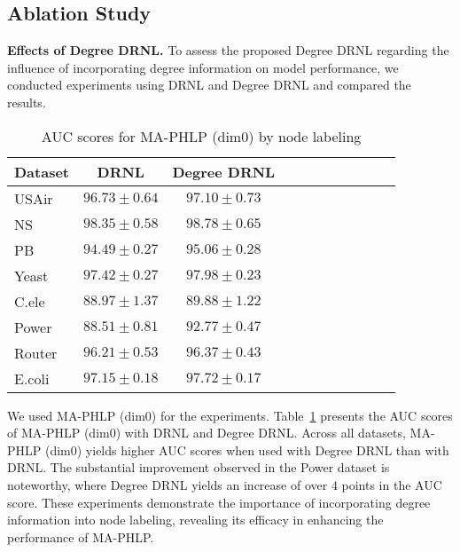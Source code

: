 \subsection{Ablation Study}
\noindent\textbf{Effects of Degree DRNL.} To assess the proposed Degree DRNL regarding the influence of incorporating degree information on model performance, we conducted experiments using DRNL and Degree DRNL and compared the results. 
\begin{table}[ht!]
\centering
\caption{AUC scores for MA-PHLP (dim$0$) by node labeling}
\begin{tabular}{l|cccccccccc}
\toprule
Dataset & DRNL & Degree DRNL \\
\midrule
USAir & $96.73\pm0.64$ & $\mathbf{97.10} \pm \mathbf{0.73}$ \\
NS & ${98.35} \pm {0.58}$ & $\mathbf{98.78}\pm\mathbf{0.65}$ \\ 
PB & $94.49\pm0.27$ & $\mathbf{95.06} \pm \mathbf{0.28}$ \\ 
Yeast & $97.42\pm0.27$ & $\mathbf{97.98} \pm \mathbf{0.23}$ \\
C.ele& $88.97\pm1.37$ & $\mathbf{89.88} \pm \mathbf{1.22}$ \\
Power & $88.51\pm0.81$ & $\mathbf{92.77} \pm \mathbf{0.47}$ \\
Router & $96.21\pm0.53$ & $\mathbf{96.37} \pm \mathbf{0.43}$ \\ 
E.coli & $97.15\pm0.18$ & $\mathbf{97.72} \pm \mathbf{0.17}$ \\
\bottomrule
\end{tabular}
\label{tbl:nodelabel}
\end{table}
We used MA-PHLP (dim$0$) for the experiments.
Table~\ref{tbl:nodelabel} presents the AUC scores of MA-PHLP (dim$0$) with DRNL and Degree DRNL.
Across all datasets, MA-PHLP (dim$0$) yields higher AUC scores when used with Degree DRNL than with DRNL.
The substantial improvement observed in the Power dataset is noteworthy, where Degree DRNL yields an increase of over $4$ points in the AUC score.
These experiments demonstrate the importance of incorporating degree information into node labeling, revealing its efficacy in enhancing the performance of MA-PHLP. 


